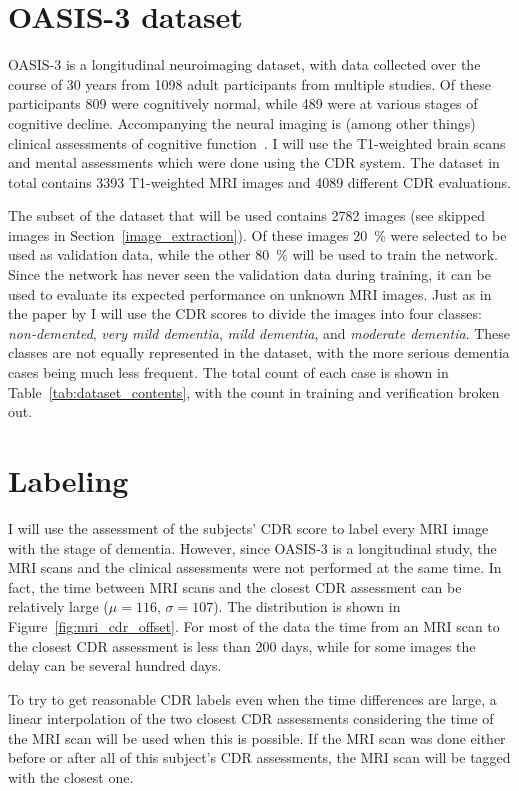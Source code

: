 \documentclass{kththesis}
\begin{document}
\section{OASIS-3 dataset} \label{dataset}
OASIS-3 is a longitudinal neuroimaging dataset, with data collected over the course of 30 years from 1098 adult participants from multiple studies. Of these participants 809 were cognitively normal, while 489 were at various stages of cognitive decline. Accompanying the neural imaging is (among other things) clinical assessments of cognitive function~\cite{oasis3}. I will use the T1-weighted brain scans and mental assessments which were done using the CDR system. The dataset in total contains 3393 T1-weighted MRI images and 4089 different CDR evaluations.

The subset of the dataset that will be used contains 2782 images (see skipped images in Section~\ref{image_extraction}). Of these images 20~\% were selected to be used as validation data, while the other 80~\% will be used to train the network. Since the network has never seen the validation data during training, it can be used to evaluate its expected performance on unknown MRI images. Just as in the paper by \textcite{islam2018early} I will use the CDR scores to divide the images into four classes: \textit{non-demented}, \textit{very mild dementia}, \textit{mild dementia}, and \textit{moderate dementia}. These classes are not equally represented in the dataset, with the more serious dementia cases being much less frequent. The total count of each case is shown in Table~\ref{tab:dataset_contents}, with the count in training and verification broken out.

\section{Labeling}
I will use the assessment of the subjects' CDR score to label every MRI image with the stage of dementia. However, since OASIS-3 is a longitudinal study, the MRI scans and the clinical assessments were not performed at the same time. In fact, the time between MRI scans and the closest CDR assessment can be relatively large ($\mu=116$, $\sigma=107$). The distribution is shown in Figure~\ref{fig:mri_cdr_offset}. For most of the data the time from an MRI scan to the closest CDR assessment is less than 200 days, while for some images the delay can be several hundred days.

To try to get reasonable CDR labels even when the time differences are large, a linear interpolation of the two closest CDR assessments considering the time of the MRI scan will be used when this is possible. If the MRI scan was done either before or after all of this subject's CDR assessments, the MRI scan will be tagged with the closest one.
\end{document}
